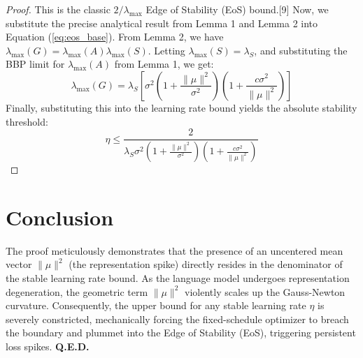 \documentclass[11pt, a4paper]{article}
\begin{document}
\begin{proof}
This is the classic $2/\lambda_{\max}$ Edge of Stability (EoS) bound.[9]
Now, we substitute the precise analytical result from Lemma 1 and Lemma 2 into Equation (\ref{eq:eos_base}). From Lemma 2, we have $\lambda_{\max}(G) = \lambda_{\max}(A) \lambda_{\max}(S)$. Letting $\lambda_{\max}(S) = \lambda_S$, and substituting the BBP limit for $\lambda_{\max}(A)$ from Lemma 1, we get:
\begin{equation}
    \lambda_{\max}(G) = \lambda_S \left[ \sigma^2 \left( 1 + \frac{\|\mu\|^2}{\sigma^2} \right) \left( 1 + \frac{c \sigma^2}{\|\mu\|^2} \right) \right]
\end{equation}
Finally, substituting this into the learning rate bound yields the absolute stability threshold:
\begin{equation}
    \eta \le \frac{2}{\lambda_S \sigma^2 \left( 1 + \frac{\|\mu\|^2}{\sigma^2} \right) \left( 1 + \frac{c \sigma^2}{\|\mu\|^2} \right)}
\end{equation}
\end{proof}

\section{Conclusion}
The proof meticulously demonstrates that the presence of an uncentered mean vector $\|\mu\|^2$ (the representation spike) directly resides in the denominator of the stable learning rate bound. As the language model undergoes representation degeneration, the geometric term $\|\mu\|^2$ violently scales up the Gauss-Newton curvature. Consequently, the upper bound for any stable learning rate $\eta$ is severely constricted, mechanically forcing the fixed-schedule optimizer to breach the boundary and plummet into the Edge of Stability (EoS), triggering persistent loss spikes. \textbf{Q.E.D.}
\end{document}
